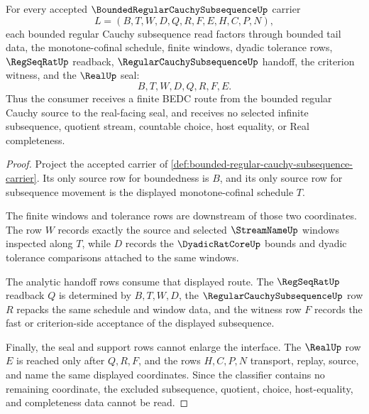\begin{theorem}
\label{thm:bounded-regular-cauchy-subsequence-selection}
For every accepted $\BoundedRegularCauchySubsequenceUp$ carrier
$$
L=(B,T,W,D,Q,R,F,E,H,C,P,N),
$$
each bounded regular Cauchy subsequence read factors through bounded tail data, the monotone-cofinal schedule, finite windows, dyadic tolerance rows, $\RegSeqRatUp$ readback, $\RegularCauchySubsequenceUp$ handoff, the criterion witness, and the $\RealUp$ seal:
$$
B,T,W,D,Q,R,F,E.
$$
Thus the consumer receives a finite BEDC route from the bounded regular Cauchy source to the real-facing seal, and receives no selected infinite subsequence, quotient stream, countable choice, host equality, or Real completeness.
\end{theorem}
\begin{proof}
Project the accepted carrier of \autoref{def:bounded-regular-cauchy-subsequence-carrier}. Its only source row for boundedness is $B$, and its only source row for subsequence movement is the displayed monotone-cofinal schedule $T$.

The finite windows and tolerance rows are downstream of those two coordinates. The row $W$ records exactly the source and selected $\StreamNameUp$ windows inspected along $T$, while $D$ records the $\DyadicRatCoreUp$ bounds and dyadic tolerance comparisons attached to the same windows.

The analytic handoff rows consume that displayed route. The $\RegSeqRatUp$ readback $Q$ is determined by $B,T,W,D$, the $\RegularCauchySubsequenceUp$ row $R$ repacks the same schedule and window data, and the witness row $F$ records the fast or criterion-side acceptance of the displayed subsequence.

Finally, the seal and support rows cannot enlarge the interface. The $\RealUp$ row $E$ is reached only after $Q,R,F$, and the rows $H,C,P,N$ transport, replay, source, and name the same displayed coordinates. Since the classifier contains no remaining coordinate, the excluded subsequence, quotient, choice, host-equality, and completeness data cannot be read.
\end{proof}

